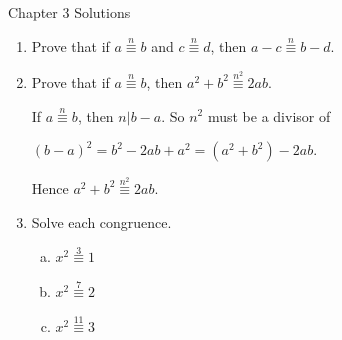 \documentclass[11pt,fleqn,dvipsnames,usenames]{article}
\renewcommand{\headrulewidth}{1pt}
\begin{document}
\fancyhead[L]{\course}
\fancyhead[R]{\term}
\renewcommand{\headrulewidth}{0.4pt}

{\huge Chapter 3 Solutions}
\vsp

\begin{enumerate}
\item Prove that if $a\overset{n}{\equiv}b$ and $c\overset{n}{\equiv}d$, then $a-c\overset{n}{\equiv}b-d$.
\item Prove that if $a\overset{n}{\equiv}b$, then $a^2 + b^2\overset{n^2}{\equiv}2ab$.
\vsmsp

\solution If $a\overset{n}{\equiv}b$, then $n|b-a$.  So $n^2$ must be a divisor of
\begin{center}
$(b-a)^2 = b^2 - 2ab + a^2 = (a^2 + b^2) - 2ab$.
\end{center}
Hence $a^2 + b^2\overset{n^2}{\equiv}2ab$.
\item Solve each congruence.
\begin{enumerate}[(a)]
\item $x^2\overset{3}{\equiv}1$
\item $x^2\overset{7}{\equiv}2$
\item $x^2\overset{11}{\equiv}3$
\end{enumerate}
\vsmsp


\end{enumerate}
\end{document}
